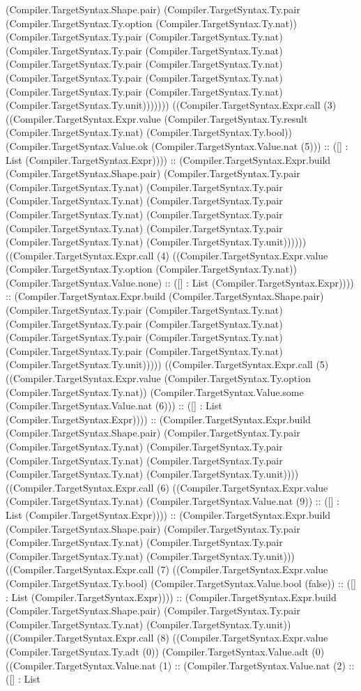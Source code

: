 \documentclass[11pt]{article}
\begin{document}
(Compiler.TargetSyntax.Shape.pair) (Compiler.TargetSyntax.Ty.pair (Compiler.TargetSyntax.Ty.option (Compiler.TargetSyntax.Ty.nat)) (Compiler.TargetSyntax.Ty.pair (Compiler.TargetSyntax.Ty.nat) (Compiler.TargetSyntax.Ty.pair (Compiler.TargetSyntax.Ty.nat) (Compiler.TargetSyntax.Ty.pair (Compiler.TargetSyntax.Ty.nat) (Compiler.TargetSyntax.Ty.pair (Compiler.TargetSyntax.Ty.nat) (Compiler.TargetSyntax.Ty.pair (Compiler.TargetSyntax.Ty.nat) (Compiler.TargetSyntax.Ty.unit))))))) ((Compiler.TargetSyntax.Expr.call (3) ((Compiler.TargetSyntax.Expr.value (Compiler.TargetSyntax.Ty.result (Compiler.TargetSyntax.Ty.nat) (Compiler.TargetSyntax.Ty.bool)) (Compiler.TargetSyntax.Value.ok (Compiler.TargetSyntax.Value.nat (5))) :: ([] : List (Compiler.TargetSyntax.Expr)))) :: (Compiler.TargetSyntax.Expr.build (Compiler.TargetSyntax.Shape.pair) (Compiler.TargetSyntax.Ty.pair (Compiler.TargetSyntax.Ty.nat) (Compiler.TargetSyntax.Ty.pair (Compiler.TargetSyntax.Ty.nat) (Compiler.TargetSyntax.Ty.pair (Compiler.TargetSyntax.Ty.nat) (Compiler.TargetSyntax.Ty.pair (Compiler.TargetSyntax.Ty.nat) (Compiler.TargetSyntax.Ty.pair (Compiler.TargetSyntax.Ty.nat) (Compiler.TargetSyntax.Ty.unit)))))) ((Compiler.TargetSyntax.Expr.call (4) ((Compiler.TargetSyntax.Expr.value (Compiler.TargetSyntax.Ty.option (Compiler.TargetSyntax.Ty.nat)) (Compiler.TargetSyntax.Value.none) :: ([] : List (Compiler.TargetSyntax.Expr)))) :: (Compiler.TargetSyntax.Expr.build (Compiler.TargetSyntax.Shape.pair) (Compiler.TargetSyntax.Ty.pair (Compiler.TargetSyntax.Ty.nat) (Compiler.TargetSyntax.Ty.pair (Compiler.TargetSyntax.Ty.nat) (Compiler.TargetSyntax.Ty.pair (Compiler.TargetSyntax.Ty.nat) (Compiler.TargetSyntax.Ty.pair (Compiler.TargetSyntax.Ty.nat) (Compiler.TargetSyntax.Ty.unit))))) ((Compiler.TargetSyntax.Expr.call (5) ((Compiler.TargetSyntax.Expr.value (Compiler.TargetSyntax.Ty.option (Compiler.TargetSyntax.Ty.nat)) (Compiler.TargetSyntax.Value.some (Compiler.TargetSyntax.Value.nat (6))) :: ([] : List (Compiler.TargetSyntax.Expr)))) :: (Compiler.TargetSyntax.Expr.build (Compiler.TargetSyntax.Shape.pair) (Compiler.TargetSyntax.Ty.pair (Compiler.TargetSyntax.Ty.nat) (Compiler.TargetSyntax.Ty.pair (Compiler.TargetSyntax.Ty.nat) (Compiler.TargetSyntax.Ty.pair (Compiler.TargetSyntax.Ty.nat) (Compiler.TargetSyntax.Ty.unit)))) ((Compiler.TargetSyntax.Expr.call (6) ((Compiler.TargetSyntax.Expr.value (Compiler.TargetSyntax.Ty.nat) (Compiler.TargetSyntax.Value.nat (9)) :: ([] : List (Compiler.TargetSyntax.Expr)))) :: (Compiler.TargetSyntax.Expr.build (Compiler.TargetSyntax.Shape.pair) (Compiler.TargetSyntax.Ty.pair (Compiler.TargetSyntax.Ty.nat) (Compiler.TargetSyntax.Ty.pair (Compiler.TargetSyntax.Ty.nat) (Compiler.TargetSyntax.Ty.unit))) ((Compiler.TargetSyntax.Expr.call (7) ((Compiler.TargetSyntax.Expr.value (Compiler.TargetSyntax.Ty.bool) (Compiler.TargetSyntax.Value.bool (false)) :: ([] : List (Compiler.TargetSyntax.Expr)))) :: (Compiler.TargetSyntax.Expr.build (Compiler.TargetSyntax.Shape.pair) (Compiler.TargetSyntax.Ty.pair (Compiler.TargetSyntax.Ty.nat) (Compiler.TargetSyntax.Ty.unit)) ((Compiler.TargetSyntax.Expr.call (8) ((Compiler.TargetSyntax.Expr.value (Compiler.TargetSyntax.Ty.adt (0)) (Compiler.TargetSyntax.Value.adt (0) ((Compiler.TargetSyntax.Value.nat (1) :: (Compiler.TargetSyntax.Value.nat (2) :: ([] : List 
\end{document}
